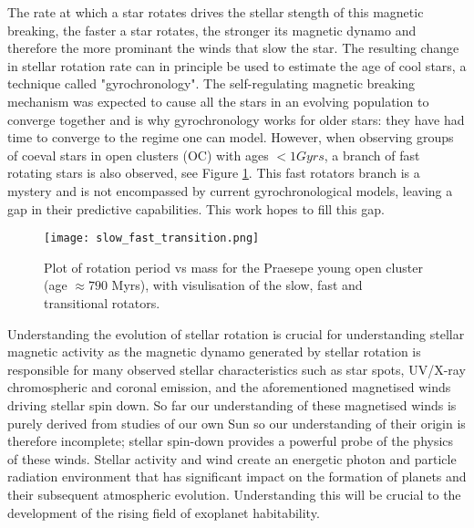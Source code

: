 \documentclass[fleqn,usenatbib]{mnras}
\begin{document}
The rate at which a star rotates drives the stellar stength of this magnetic breaking, the faster a star rotates, the stronger its magnetic dynamo and therefore the more prominant the winds that slow the star.
The resulting change in stellar rotation rate can in principle be used to estimate the age of cool stars, a technique called "gyrochronology".
The self-regulating magnetic breaking mechanism was expected to cause all the stars in an evolving population to converge together and is why gyrochronology works for older stars: they have had time to converge to the regime one can model.
However, when observing groups of coeval stars in open clusters (OC) with ages $< 1Gyrs$, a branch of fast rotating stars is also observed, see Figure \ref{fig:slow_fast_transition}.
This fast rotators branch is a mystery and is not encompassed by current gyrochronological models, leaving a gap in their predictive capabilities.
This work hopes to fill this gap.


\begin{figure}
	\texttt{[image: slow\_fast\_transition.png]}
	\caption[]{Plot of rotation period vs mass for the Praesepe young open cluster (age $\approx 790$ Myrs), with visulisation of the slow, fast and transitional rotators.}
	\label{fig:slow_fast_transition}
\end{figure}

Understanding the evolution of stellar rotation is crucial for understanding stellar magnetic activity as the magnetic dynamo generated by stellar rotation is responsible for many observed stellar characteristics such as star spots, UV/X-ray chromospheric and coronal emission, and the aforementioned magnetised winds driving stellar spin down.
So far our understanding of these magnetised winds is purely derived from studies of our own Sun so our understanding of their origin is therefore incomplete; stellar spin-down provides a powerful probe of the physics of these winds.
Stellar activity and wind create an energetic photon and particle radiation environment that has significant impact on the formation of planets and their subsequent atmospheric evolution.
Understanding this will be crucial to the development of the rising field of exoplanet habitability.
\end{document}

